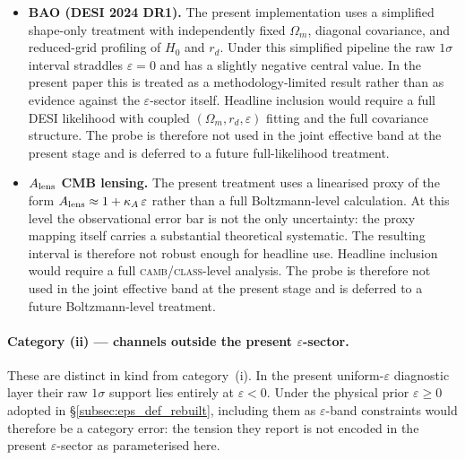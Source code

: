 \begin{itemize}[leftmargin=1.4em,itemsep=2pt,topsep=4pt]
\item \textbf{BAO (DESI 2024 DR1).} The present implementation uses a
simplified shape-only treatment with independently fixed $\Omega_m$,
diagonal covariance, and reduced-grid profiling of $H_0$ and $r_d$.
Under this simplified pipeline the raw $1\sigma$ interval straddles
$\varepsilon = 0$ and has a slightly negative central value. In the
present paper this is treated as a methodology-limited result rather
than as evidence against the $\varepsilon$-sector itself. Headline
inclusion would require a full DESI likelihood with coupled
$(\Omega_m, r_d, \varepsilon)$ fitting and the full covariance
structure. The probe is therefore not used in the joint effective
band at the present stage and is deferred to a future full-likelihood
treatment.

\item \textbf{$A_{\rm lens}$ CMB lensing.} The present treatment uses
a linearised proxy of the form
$A_{\rm lens} \approx 1 + \kappa_A\,\varepsilon$ rather than a full
Boltzmann-level calculation. At this level the observational error bar
is not the only uncertainty: the proxy mapping itself carries a
substantial theoretical systematic. The resulting interval is
therefore not robust enough for headline use. Headline inclusion would
require a full \textsc{camb}/\textsc{class}-level analysis. The probe
is therefore not used in the joint effective band at the present stage
and is deferred to a future Boltzmann-level treatment.
\end{itemize}

\paragraph{Category (ii) --- channels outside the present $\varepsilon$-sector.}
These are distinct in kind from category~(i). In the present
uniform-$\varepsilon$ diagnostic layer their raw $1\sigma$ support
lies entirely at $\varepsilon < 0$. Under the physical prior
$\varepsilon \geq 0$ adopted in \S\ref{subsec:eps_def_rebuilt},
including them as $\varepsilon$-band constraints would therefore be a
category error: the tension they report is not encoded in the present
$\varepsilon$-sector as parameterised here.

